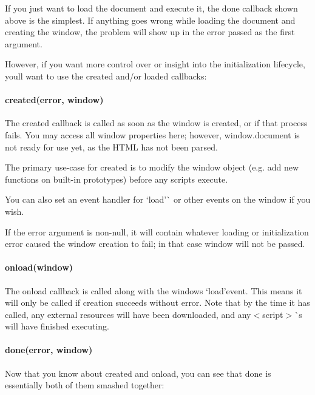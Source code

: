 If you just want to load the document and execute it, the {\ttfamily done} callback shown above is the simplest. If anything goes wrong while loading the document and creating the window, the problem will show up in the {\ttfamily error} passed as the first argument.

However, if you want more control over or insight into the initialization lifecycle, you\textquotesingle{}ll want to use the {\ttfamily created} and/or {\ttfamily loaded} callbacks\+:

\paragraph*{{\ttfamily created(error, window)}}

The {\ttfamily created} callback is called as soon as the window is created, or if that process fails. You may access all {\ttfamily window} properties here; however, {\ttfamily window.\+document} is not ready for use yet, as the H\+T\+ML has not been parsed.

The primary use-\/case for {\ttfamily created} is to modify the window object (e.\+g. add new functions on built-\/in prototypes) before any scripts execute.

You can also set an event handler for `\textquotesingle{}load'\`{} or other events on the window if you wish.

If the {\ttfamily error} argument is non-\/{\ttfamily null}, it will contain whatever loading or initialization error caused the window creation to fail; in that case {\ttfamily window} will not be passed.

\paragraph*{{\ttfamily onload(window)}}

The {\ttfamily onload} callback is called along with the window\textquotesingle{}s `\textquotesingle{}load'{\ttfamily event. This means it will only be called if creation succeeds without error. Note that by the time it has called, any external resources will have been downloaded, and any}$<$script$>$\`{}s will have finished executing.

\paragraph*{{\ttfamily done(error, window)}}

Now that you know about {\ttfamily created} and {\ttfamily onload}, you can see that {\ttfamily done} is essentially both of them smashed together\+:


